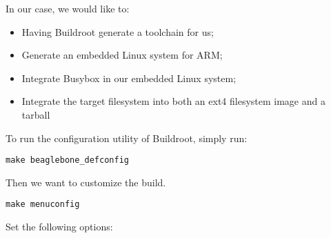 In our case, we would like to:

\begin{itemize}
\item Having Buildroot generate a toolchain for us;
\item Generate an embedded Linux system for ARM;
\item Integrate Busybox in our embedded Linux system;
\item Integrate the target filesystem into both an ext4 filesystem
  image and a tarball
\end{itemize}

To run the configuration utility of Buildroot, simply run:

\begin{verbatim}
make beaglebone_defconfig
\end{verbatim}

Then we want to customize the build.

\begin{verbatim}
make menuconfig
\end{verbatim}

Set the following options:

